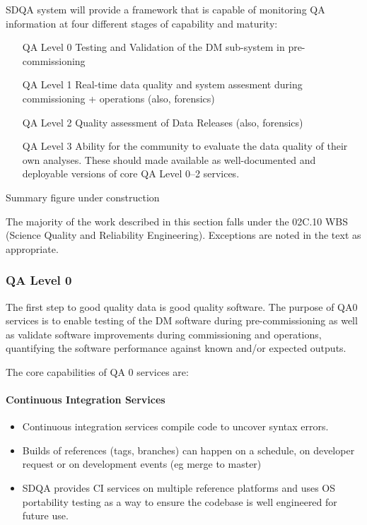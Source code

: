 SDQA system will provide a framework that is capable of monitoring QA
information at four different stages of capability and maturity:

\begin{itemize}
\item[QA Level 0] Testing and Validation of the DM sub-system in pre-commissioning
\item[QA Level 1] Real-time data quality and system assesment during commissioning + operations (also, forensics)
\item[QA Level 2] Quality assessment of Data Releases (also, forensics)
\item[QA Level 3] Ability for the community to evaluate the data quality of their own analyses. These should made available as well-documented and deployable versions of core QA Level 0--2 services.
\end{itemize}

\begin{note}
Summary figure under construction
\end{note}

The majority of the work described in this section falls under the
02C.10 WBS (Science Quality and Reliability Engineering). Exceptions
are noted in the text as appropriate.

\subsubsection{QA Level 0}

The first step to good quality data is good quality software. The
purpose of QA0 services is to enable testing of the DM software during
pre-commissioning as well as validate software improvements during
commissioning and operations, quantifying the software performance
against known and/or expected outputs.

The core capabilities of QA 0 services are:

\paragraph{Continuous Integration Services}
\label{sec:qaCI}
\begin{itemize}

\item Continuous integration services compile code to uncover syntax errors.

\item Builds of references (tags, branches) can happen on a schedule, on developer request or on development events (eg merge to master)

\item SDQA provides CI services on multiple reference platforms and uses OS portability testing as a way to ensure the codebase is well engineered for future use.

\end{itemize}

